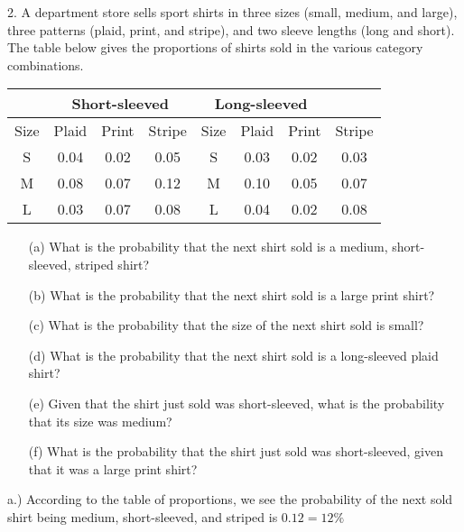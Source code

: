 \documentclass{report}
\begin{document}
    \pagebreak \bigbreak \noindent 
    \begin{mdframed}
        2. A department store sells sport shirts in three sizes (small, medium, and large), three patterns (plaid, print, and stripe), and two sleeve lengths (long and short). The table below gives the proportions of shirts sold in the various category combinations.

        \begin{center}
            \begin{tabular}{|c|c|c|c|c|c|c|c|}
                \hline
                & \multicolumn{3}{|c|}{Short-sleeved} & \multicolumn{3}{|c|}{Long-sleeved} \\
                \hline
                Size & Plaid & Print & Stripe & Size & Plaid & Print & Stripe \\
                \hline
                S & 0.04 & 0.02 & 0.05 & S & 0.03 & 0.02 & 0.03 \\
                M & 0.08 & 0.07 & 0.12 & M & 0.10 & 0.05 & 0.07 \\
                L & 0.03 & 0.07 & 0.08 & L & 0.04 & 0.02 & 0.08 \\
                \hline
            \end{tabular}
        \end{center}
        \begin{itemize}
            \item[(a)] What is the probability that the next shirt sold is a medium, short-sleeved, striped shirt?
            \item[(b)] What is the probability that the next shirt sold is a large print shirt?
            \item[(c)] What is the probability that the size of the next shirt sold is small?
            \item[(d)] What is the probability that the next shirt sold is a long-sleeved plaid shirt?
            \item[(e)] Given that the shirt just sold was short-sleeved, what is the probability that its size was medium?
            \item[(f)] What is the probability that the shirt just sold was short-sleeved, given that it was a large print shirt?
        \end{itemize}
    \end{mdframed}
    \bigbreak \noindent 
    a.) According to the table of proportions, we see the probability of the next sold shirt being medium, short-sleeved, and striped is $0.12 = 12\% $
\end{document}
